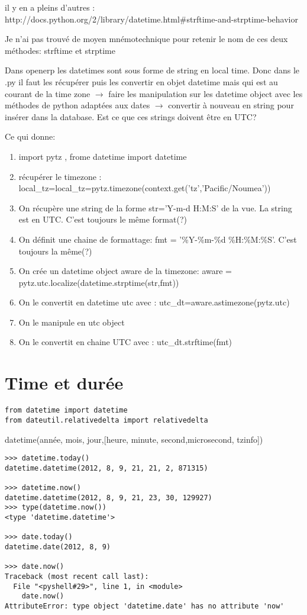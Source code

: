 \documentclass[12pt,a4paper]{article}
\begin{document}
il y en a pleins d'autres : http://docs.python.org/2/library/datetime.html\#strftime-and-strptime-behavior

Je n'ai pas trouvé de moyen mnémotechnique pour retenir le nom de ces deux méthodes: strftime et strptime 

Dans openerp les datetimes sont sous forme de string en local time. Donc dans le .py il faut les récupérer puis les convertir en objet datetime mais qui est au courant de la time zone $\rightarrow$ faire les manipulation sur les datetime object avec les méthodes de python adaptées aux dates $\rightarrow$ convertir à nouveau en string pour insérer dans la database. Est ce que ces strings doivent être en UTC?  

Ce qui donne: 
\begin{enumerate}
\item import pytz , frome datetime import datetime
\item récupérer le timezone : local\_tz=local\_tz=pytz.timezone(context.get('tz','Pacific/Noumea'))
\item On récupère une string de la forme str='Y-m-d H:M:S' de la vue. La string est en UTC. C'est toujours le même format(?)
\item On définit une chaine de formattage: fmt = '\%Y-\%m-\%d \%H:\%M:\%S'. C'est toujours la même(?)
\item On crée un datetime object aware de la timezone: aware = pytz.utc.localize(datetime.strptime(str,fmt))
\item On le convertit en datetime utc avec : utc\_dt=aware.astimezone(pytz.utc)
\item On le manipule en utc object 
\item On le convertit en chaine UTC avec : utc\_dt.strftime(fmt)
\end{enumerate}

\section{Time et durée}
\label{sec:time}
\begin{verbatim}
from datetime import datetime
from dateutil.relativedelta import relativedelta
\end{verbatim}
datetime(année, mois, jour,[heure, minute, second,microsecond, tzinfo])\\

\begin{verbatim}
>>> datetime.today()
datetime.datetime(2012, 8, 9, 21, 21, 2, 871315)

>>> datetime.now()
datetime.datetime(2012, 8, 9, 21, 23, 30, 129927)
>>> type(datetime.now())
<type 'datetime.datetime'>

>>> date.today()
datetime.date(2012, 8, 9)

>>> date.now()
Traceback (most recent call last):
  File "<pyshell#29>", line 1, in <module>
    date.now()
AttributeError: type object 'datetime.date' has no attribute 'now'
\end{verbatim}
\end{document}
